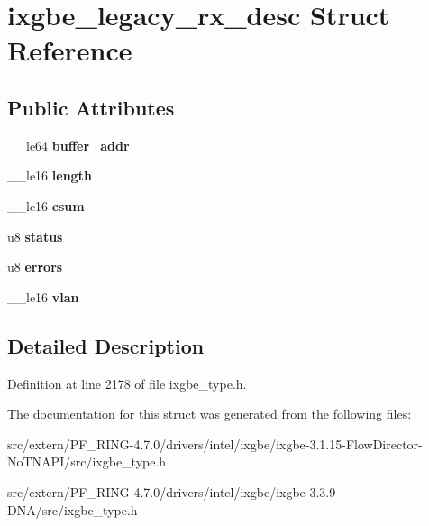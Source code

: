 \hypertarget{structixgbe__legacy__rx__desc}{
\section{ixgbe\_\-legacy\_\-rx\_\-desc Struct Reference}
\label{structixgbe__legacy__rx__desc}
}
\subsection*{Public Attributes}
\begin{DoxyCompactItemize}
\item 
\hypertarget{structixgbe__legacy__rx__desc_a42cb898d008de50c899659e9329422b8}{
\_\-\_\-le64 {\bfseries buffer\_\-addr}}
\label{structixgbe__legacy__rx__desc_a42cb898d008de50c899659e9329422b8}

\item 
\hypertarget{structixgbe__legacy__rx__desc_a62afccd01d571ae690f427804f55c6fa}{
\_\-\_\-le16 {\bfseries length}}
\label{structixgbe__legacy__rx__desc_a62afccd01d571ae690f427804f55c6fa}

\item 
\hypertarget{structixgbe__legacy__rx__desc_a7757c810c2eeb73b14e282a23f8e920d}{
\_\-\_\-le16 {\bfseries csum}}
\label{structixgbe__legacy__rx__desc_a7757c810c2eeb73b14e282a23f8e920d}

\item 
\hypertarget{structixgbe__legacy__rx__desc_a5b0264a26df111fb999e6d667f5b5cda}{
u8 {\bfseries status}}
\label{structixgbe__legacy__rx__desc_a5b0264a26df111fb999e6d667f5b5cda}

\item 
\hypertarget{structixgbe__legacy__rx__desc_a68fb362ff5008553685cb336f7063fb0}{
u8 {\bfseries errors}}
\label{structixgbe__legacy__rx__desc_a68fb362ff5008553685cb336f7063fb0}

\item 
\hypertarget{structixgbe__legacy__rx__desc_ac25c24130bf8ca7b26a37c306bb44bc7}{
\_\-\_\-le16 {\bfseries vlan}}
\label{structixgbe__legacy__rx__desc_ac25c24130bf8ca7b26a37c306bb44bc7}

\end{DoxyCompactItemize}


\subsection{Detailed Description}


Definition at line 2178 of file ixgbe\_\-type.h.



The documentation for this struct was generated from the following files:\begin{DoxyCompactItemize}
\item 
src/extern/PF\_\-RING-\/4.7.0/drivers/intel/ixgbe/ixgbe-\/3.1.15-\/FlowDirector-\/NoTNAPI/src/ixgbe\_\-type.h\item 
src/extern/PF\_\-RING-\/4.7.0/drivers/intel/ixgbe/ixgbe-\/3.3.9-\/DNA/src/ixgbe\_\-type.h\end{DoxyCompactItemize}
